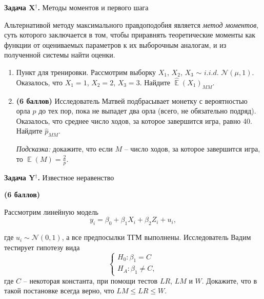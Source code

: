 \documentclass[10pt, a4paper]{extarticle}
\DeclareMathOperator{\E}{\mathbb{E}}
\renewcommand{\le}{\leqslant}
\begin{document}
\newpage	
{\Large \textbf{Задача X$^{\dagger}$.} Методы моментов и первого шага}

Альтернативой методу максимального правдоподобия является \textit{метод моментов}, суть которого заключается в том, чтобы приравнять теоретические моменты как функции от оцениваемых параметров к их выборочным аналогам, и из полученной системы найти оценки.

\begin{enumerate}
	\item Пункт для тренировки. Рассмотрим выборку $X_1$, $X_2$, $X_3$ $\sim$ $i.i.d.$ $\mathcal{N}(\mu, 1)$. Оказалось, что $X_1 = 1$, $X_2 = 2$, $X_3 = 3$. Найдите $\hat{\E}(X_1)_{MM}$.
	
	\item \textbf{(6 баллов)} Исследователь Матвей подбрасывает монетку с вероятностью орла $p$ до тех пор, пока не выпадет два орла (всего, не обязательно подряд). Оказалось, что среднее число ходов, за которое завершится игра, равно 40. Найдите $\hat{p}_{MM}$.
	
	\textit{Подсказка:} докажите, что если $M$ – число ходов, за которое завершится игра, то $\E(M) = \frac{2}{p}$.
\end{enumerate}

{\Large \textbf{Задача Y$^{\dagger}$.} Известное неравенство}

\textbf{(6 баллов)} 

Рассмотрим линейную модель
\[
y_i = \beta_0 + \beta_1X_i + \beta_2Z_i + u_i,
\]

где $u_i \sim \mathcal{N}(0, 1)$, а все предпосылки ТГМ выполнены. Исследователь Вадим тестирует гипотезу вида
\[\begin{cases}
	H_0: \beta_1 = C \\
	H_A: \beta_1 \ne C,
\end{cases}
\]
где $C$ – некоторая константа, при помощи тестов $LR$, $LM$ и $W$. Докажите, что в такой постановке всегда верно, что $LM \le LR \le W$. 
	
\end{document}
